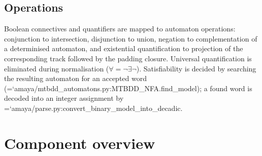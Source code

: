 \documentclass[10pt,a4paper]{article}
\newcommand{\code}[1]{{\small\ttfamily\hyphenchar\font=`\-\relax #1}}
\begin{document}
\subsection{Operations}

Boolean connectives and quantifiers are mapped to automaton operations: conjunction to intersection,
disjunction to union, negation to complementation of a determinised automaton, and existential
quantification to projection of the corresponding track followed by the padding closure.  Universal
quantification is eliminated during normalisation ($\forall = \neg\exists\neg$).  Satisfiability is
decided by searching the resulting automaton for an accepted word
(\code{amaya/mtbdd\_\allowbreak automatons.py:\allowbreak MTBDD\_\allowbreak NFA.find\_\allowbreak model}); a found word is decoded into an integer
assignment by \code{amaya/parse.py:\allowbreak convert\_\allowbreak binary\_\allowbreak model\_\allowbreak into\_\allowbreak decadic}.

\section{Component overview}
\label{sec:overview}
\end{document}
